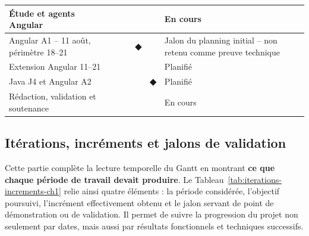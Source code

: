 \begin{table}[H]
\begin{tabularx}{\textwidth}{|>{\RaggedRight\arraybackslash}p{4.6cm}|c|c|c|c|c|>{\RaggedRight\arraybackslash}X|}
        \hline
        Étude et agents Angular & & & \cellcolor{emsigreen!35} & \cellcolor{emsigreen!35} & & En cours \\
        \hline
        Angular A1 -- 11 août, périmètre 18--21 & & & & \cellcolor{cgired!25}\textbf{◆} & & Jalon du planning initial -- non retenu comme preuve technique \\
        \hline
        Extension Angular 11--21 & & & & \cellcolor{emsigreen!25} & \cellcolor{emsigreen!35} & Planifié \\
        \hline
        Java J4 et Angular A2 & & & & & \cellcolor{cgired!25}\textbf{◆} & Planifié \\
        \hline
        Rédaction, validation et soutenance & & & \cellcolor{cgigray!20} & \cellcolor{cgigray!30} & \cellcolor{cgigray!20} & En cours \\
        \hline
    \end{tabularx}
\end{table}
\normalsize

\begin{center}
\end{center}

\subsection{Itérations, incréments et jalons de validation}

Cette partie complète la lecture temporelle du Gantt en montrant \textbf{ce que chaque période de travail devait produire}. Le Tableau~\ref{tab:iterations-increments-ch1} relie ainsi quatre éléments : la période considérée, l'objectif poursuivi, l'incrément effectivement obtenu et le jalon servant de point de démonstration ou de validation. Il permet de suivre la progression du projet non seulement par dates, mais aussi par résultats fonctionnels et techniques successifs.

